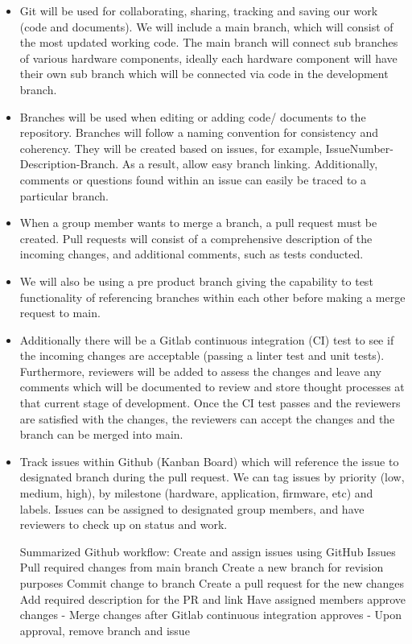 \documentclass{article}
\begin{document}
\begin{itemize}
	\item Git will be used for collaborating, sharing, tracking and saving our work (code and documents). We will include a main branch, which will consist of the most updated working code. The main branch will connect sub branches of various hardware components, ideally each hardware component will have their own sub branch which will be connected via code in the development branch.
	
	\item Branches will be used when editing or adding code/ documents to the repository. Branches will follow a naming convention for consistency and coherency. They will be created based on issues, for example, IssueNumber-Description-Branch. As a result, allow easy branch linking. Additionally, comments or questions found within an issue can easily be traced to a particular branch. 
	
	\item When a group member wants to merge a branch, a pull request must be created. Pull requests will consist of a comprehensive description of the incoming changes, and additional comments, such as tests conducted. 
	
	\item We will also be using a pre product branch giving the capability to test functionality of referencing branches within each other before making a merge request to main.
	
	\item Additionally there will be a Gitlab continuous integration (CI) test to see if the incoming changes are acceptable (passing a linter test and unit tests). Furthermore, reviewers will be added to assess the changes and leave any comments which will be documented to review and store thought processes at that current stage of development. Once the CI test passes and the reviewers are satisfied with the changes, the reviewers can accept the changes and the branch can be merged into main. 
	
	\item Track issues within Github (Kanban Board) which will reference the issue to designated branch during the pull request. We can tag issues by priority (low, medium, high), by milestone (hardware, application, firmware, etc) and labels. Issues can be assigned to designated group members, and have reviewers to check up on status and work. 
	
		Summarized Github workflow:
	Create and assign issues using GitHub Issues 
	Pull required changes from main branch
	Create a new branch for revision purposes
	Commit change to branch
	Create a pull request for the new changes
	Add required description for the PR and link
	Have assigned members approve changes
		  -     Merge changes after Gitlab continuous integration approves
		  -     Upon approval, remove branch and issue
	
\end{itemize}
\end{document}
